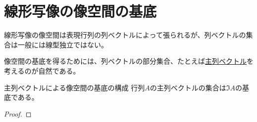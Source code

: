 \documentclass[../../../topic_linear-algebra]{subfiles}
\begin{document}
\sectionline
\section{線形写像の像空間の基底}

線形写像の像空間は表現行列の列ベクトルによって張られるが、列ベクトルの集合は一般には線型独立ではない。

像空間の基底を得るためには、列ベクトルの部分集合、たとえば\hyperref[def:pivot-columns]{主列ベクトル}を考えるのが自然である。

\begin{theorem}{主列ベクトルによる像空間の基底の構成}\label{thm:pivot-cols-form-basis}
  行列$A$の主列ベクトルの集合は$\Im A$の基底である。
\end{theorem}

\begin{proof}
\end{proof}
\end{document}
